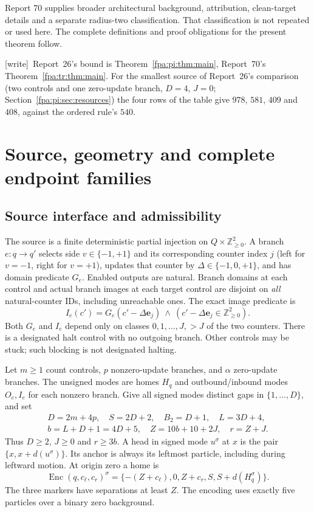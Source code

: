 \documentclass[11pt,a4paper]{article}
\numberwithin{equation}{section}
\newcommand{\Nge}{\mathbb Z_{\ge0}}\newcommand{\Nzero}{\mathbb N_0}
\newcommand{\wtag}{\textup{[write]}}
\begin{document}
Report 70 supplies broader architectural background, attribution, clean-target details and a separate radius-two classification. That classification is not repeated or used here. The complete definitions and proof obligations for the present theorem follow.

\wtag\ Report~26's bound is Theorem~\ref{fpa:pi:thm:main}, Report~70's Theorem~\ref{fpa:tr:thm:main}. For the smallest source of Report~26's comparison (two controls and one zero-update branch, $D=4$, $J=0$; Section~\ref{fpa:pi:sec:resources}) the four rows of the table give $978$, $581$, $409$ and $408$, against the ordered rule's $540$.
\section{Source, geometry and complete endpoint families}\label{fpa:sw:sec:definitions}
\subsection{Source interface and admissibility}
The source is a finite deterministic partial injection on $Q\times\Nge^2$. A branch $e:q\to q'$ selects side $v\in\{-1,+1\}$ and its corresponding counter index $j$ (left for $v=-1$, right for $v=+1$), updates that counter by $\Delta\in\{-1,0,+1\}$, and has domain predicate $G_e$. Enabled outputs are natural. Branch domains at each control and actual branch images at each target control are disjoint on \emph{all} natural-counter IDs, including unreachable ones. The exact image predicate is
\[
I_e(c')=G_e(c'-\Delta\mathbf e_j)\ \wedge\ (c'-\Delta\mathbf e_j\in\Nge^2).
\]
Both $G_e$ and $I_e$ depend only on classes $0,1,\ldots,J,>J$ of the two counters. There is a designated halt control with no outgoing branch. Other controls may be stuck; such blocking is not designated halting.

Let $m\ge1$ count controls, $p$ nonzero-update branches, and $\alpha$ zero-update branches. The unsigned modes are homes $H_q$ and outbound/inbound modes $O_e,I_e$ for each nonzero branch. Give all signed modes distinct gaps in $\{1,\ldots,D\}$, and set
\begin{equation}\label{fpa:sw:eq:constants}
\begin{gathered}
D=2m+4p,\quad S=2D+2,\quad B_2=D+1,\quad L=3D+4,\\
b=L+D+1=4D+5,\quad Z=10b+10+2J,\quad r=Z+J.
\end{gathered}
\end{equation}
Thus $D\ge2$, $J\ge0$ and $r\ge3b$. A head in signed mode $u^\sigma$ at $x$ is the pair $\{x,x+d(u^\sigma)\}$. Its anchor is always its leftmost particle, including during leftward motion. At origin zero a home is
\[
\operatorname{Enc}(q,c_\ell,c_r)^\sigma
=\{-(Z+c_\ell),0,Z+c_r,S,S+d(H_q^\sigma)\}.
\]
The three markers have separations at least $Z$. The encoding uses exactly five particles over a binary zero background.
\end{document}
